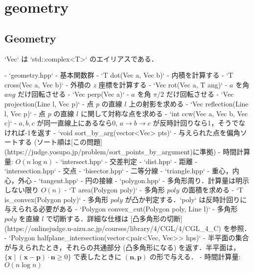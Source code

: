 \section{geometry}

\subsection{Geometry}

\begin{small}
\begin{markdown}
`Vec` は `std::complex<T>` のエイリアスである．

- `geometry.hpp`
    - 基本関数群
    - `T dot(Vec a, Vec b)`
        - 内積を計算する
    - `T cross(Vec a, Vec b)`
        - 外積の $z$ 座標を計算する
    - `Vec rot(Vec a, T ang)`
        - $a$ を角 $ang$ だけ回転させる
    - `Vec perp(Vec a)`
        - $a$ を角 $\pi/2$ だけ回転させる
    - `Vec projection(Line l, Vec p)`
        - 点 $p$ の直線 $l$ 上の射影を求める
    - `Vec reflection(Line l, Vec p)`
        - 点 $p$ の直線 $l$ に関して対称な点を求める
    - `int ccw(Vec a, Vec b, Vec c)`
        - $a,b,c$ が同一直線上にあるなら0, $a \rightarrow b \rightarrow c$ が反時計回りなら1，そうでなければ-1を返す
    - `void sort\_by\_arg(vector<Vec> pts)`
        - 与えられた点を偏角ソートする (ソート順は[この問題](https://judge.yosupo.jp/problem/sort\_points\_by\_argument)に準拠)
        - 時間計算量: $O(n\log n)$
- `intersect.hpp`
    - 交差判定
- `dist.hpp`
    - 距離
- `intersection.hpp`
    - 交点
- `bisector.hpp`
    - 二等分線
- `triangle.hpp`
    - 重心，内心，外心
- `tangent.hpp`
    - 円の接線
- `polygon.hpp`
    - 多角形周り．計算量は明示しない限り $O(n)$
    - `T area(Polygon poly)`
        - 多角形 $poly$ の面積を求める
    - `T is\_convex(Polygon poly)`
        - 多角形 $poly$ が凸か判定する．`poly` は反時計回りに与えられる必要がある
    - `Polygon convex\_cut(Polygon poly, Line l)`
        - 多角形 $poly$ を直線 $l$ で切断する．詳細な仕様は [凸多角形の切断](https://onlinejudge.u-aizu.ac.jp/courses/library/4/CGL/4/CGL\_4\_C) を参照．
    - `Polygon halfplane\_intersection(vector<pair<Vec, Vec>> hps)`
        - 半平面の集合が与えられたとき，それらの共通部分 (凸多角形になる) を返す．半平面は， $\{\boldsymbol{x}\mid(\boldsymbol{x}-\boldsymbol{p})\cdot \boldsymbol{n}\geq 0\}$ で表したときに $(\boldsymbol{n},\boldsymbol{p})$ の形で与える．
        - 時間計算量: $O(n\log n)$

\end{markdown}
\end{small}

